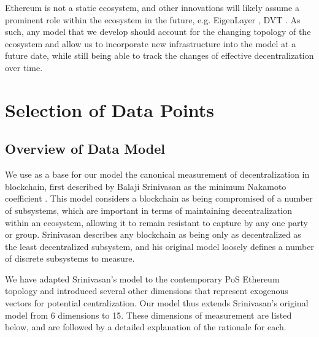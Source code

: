 \documentclass[conference]{IEEEtran}
\begin{document}
Ethereum is not a static ecosystem, and other innovations will likely assume a prominent role within the ecosystem in the future, e.g. EigenLayer \cite{eigenlayer2023}, DVT \cite{asgaonkar-2021}.  As such, any model that we develop should account for the changing topology of the ecosystem and allow us to incorporate new infrastructure into the model at a future date, while still being able to track the changes of effective decentralization over time.

\section{Selection of Data Points}

\subsection{Overview of Data Model}

We use as a base for our model the canonical measurement of decentralization in blockchain, first described by Balaji Srinivasan as the minimum Nakamoto coefficient \cite{srinivasan2018}.  This model considers a blockchain as being compromised of a number of subsystems, which are important in terms of maintaining decentralization within an ecosystem, allowing it to remain resistant to capture by any one party or group.  Srinivasan describes any blockchain as being only as decentralized as the least decentralized subsystem, and his original model loosely defines a number of discrete subsystems to measure.

We have adapted Srinivasan's model to the contemporary PoS Ethereum topology and introduced several other dimensions that represent exogenous vectors for potential centralization.  Our model thus extends Srinivasan's original model from 6 dimensions to 15.  These dimensions of measurement are listed below, and are followed by a detailed explanation of the rationale for each.

\vspace{8pt}
\end{document}

